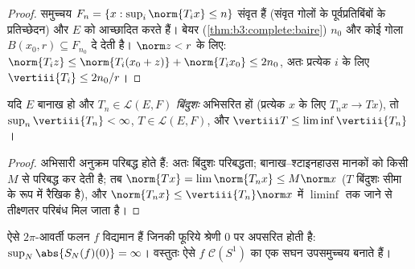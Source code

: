 \begin{proof}
समुच्चय $F_n = \{x : \sup_i\norm{T_ix} \leq n\}$ संवृत हैं (संवृत गोलों के पूर्वप्रतिबिंबों के
प्रतिच्छेदन) और $E$ को आच्छादित करते हैं। बेयर (\cref{thm:b3:complete:baire}) $n_0$
और कोई गोला $B(x_0, r) \subseteq F_{n_0}$ दे देती है। $\norm z < r$ के लिए: $\norm{T_iz}
\leq \norm{T_i(x_0 + z)} + \norm{T_ix_0} \leq 2n_0$, अतः प्रत्येक
$i$ के लिए $\vertiii{T_i} \leq 2n_0/r$।
\end{proof}

\begin{corollary}\label{cor:b3:banach:bslimits}
यदि $E$ बानाख हो और $T_n \in \mathcal L(E,F)$ \emph{बिंदुशः} अभिसरित हों (प्रत्येक
$x$ के लिए $T_nx \to Tx$), तो $\sup_n
\vertiii{T_n} < \infty$, $T \in \mathcal L(E, F)$, और $\vertiii T \leq \liminf \vertiii{T_n}$।
\end{corollary}

\begin{proof}
अभिसारी अनुक्रम परिबद्ध होते हैं: अतः बिंदुशः परिबद्धता;
बानाख--श्टाइनहाउस मानकों को किसी $M$ से परिबद्ध कर देती है; तब
$\norm{Tx}
= \lim\norm{T_nx} \leq M\norm x$ ($T$ बिंदुशः सीमा के रूप में रैखिक है), और $\norm{T_nx} \leq \vertiii{T_n}\norm x$ में
$\liminf$ तक जाने से तीक्ष्णतर परिबंध मिल जाता है।
\end{proof}

\begin{theorem}[अपसारी फूरिये श्रेणी]
\label{thm:b3:banach:fourierdiverge}
ऐसे  $2\pi$-आवर्ती फलन $f$ विद्यमान हैं जिनकी फूरिये श्रेणी
$0$ पर अपसरित होती है: $\sup_N\abs{S_N(f)(0)} =
\infty$। वस्तुतः ऐसे $f$ $\mathcal
C(S^1)$ का एक
सघन उपसमुच्चय बनाते हैं।
\end{theorem}

